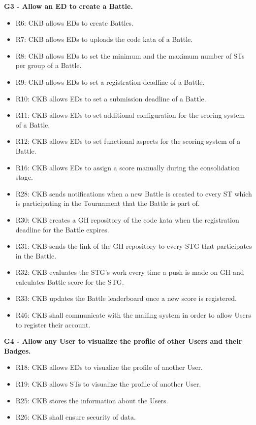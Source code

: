 \vspace{1.5cm}
\textbf{G3 - Allow an ED to create a Battle.}
\begin{itemize}
    \item R6: CKB allows EDs to create Battles.
    \item R7: CKB allows EDs to uploads the code kata of a Battle.
    \item R8: CKB allows EDs to set the minimum and the maximum number of STs per group of a Battle.
    \item R9: CKB allows EDs to set a registration deadline of a Battle.
    \item R10: CKB allows EDs to set a submission deadline of a Battle.
    \item R11: CKB allows EDs to set additional configuration for the scoring system of a Battle.
    \item R12: CKB allows EDs to set functional aspects for the scoring system of a Battle.
    \item R16: CKB allows EDs to assign a score manually during the consolidation stage.
    \item R28: CKB sends notifications when a new Battle is created to every ST which is participating in the Tournament that the Battle is part of.
    \item R30: CKB creates a GH repository of the code kata when the registration deadline for the Battle expires.
    \item R31: CKB sends the link of the GH repository to every STG that participates in the Battle.
    \item R32: CKB evaluates the STG's work every time a push is made on GH and calculates Battle score for the STG.
    \item R33: CKB updates the Battle leaderboard once a new score is registered.
    \item R46: CKB shall communicate with the mailing system in order to allow Users to register their account.
\end{itemize}


\vspace{1.5cm}
\textbf{G4 - Allow any User to visualize the profile of other Users and their Badges.}
\begin{itemize}
    \item R18: CKB allows EDs to visualize the profile of another User.
    \item R19: CKB allows STs to visualize the profile of another User.
    \item R25: CKB stores the information about the Users.
    \item R26: CKB shall ensure security of data. 
\end{itemize}


